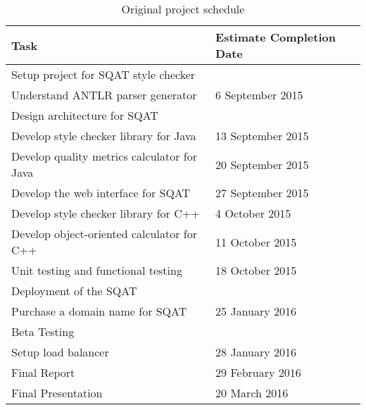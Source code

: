 \begin{table}
\centering
\begin{tabular}{ | l | l | } 
    \hline
    \textbf{Task} & \textbf{Estimate Completion Date} \\ 
    \hline
    Setup project for SQAT style checker & \\ 
    Understand ANTLR parser generator & 6 September 2015 \\
    Design architecture for SQAT & \\
    \hline
    Develop style checker library for Java & 13 September 2015 \\
    \hline
    Develop quality metrics calculator for Java & 20 September 2015 \\
    \hline
    Develop the web interface for SQAT & 27 September 2015 \\
    \hline
    Develop style checker library for C++ & 4 October 2015 \\
    \hline
    Develop object-oriented calculator for C++ & 11 October 2015 \\
    \hline
    Unit testing and functional testing & 18 October 2015 \\
    \hline
    Deployment of the SQAT & \\
    Purchase a domain name for SQAT & 25 January 2016 \\
    Beta Testing & \\
    \hline
    Setup load balancer & 28 January 2016 \\
    \hline
    Final Report & 29 February 2016 \\
    \hline
    Final Presentation & 20 March 2016 \\
    \hline
\end{tabular}
\caption{Original project schedule}
\label{table:project_schedule}
\end{table}

